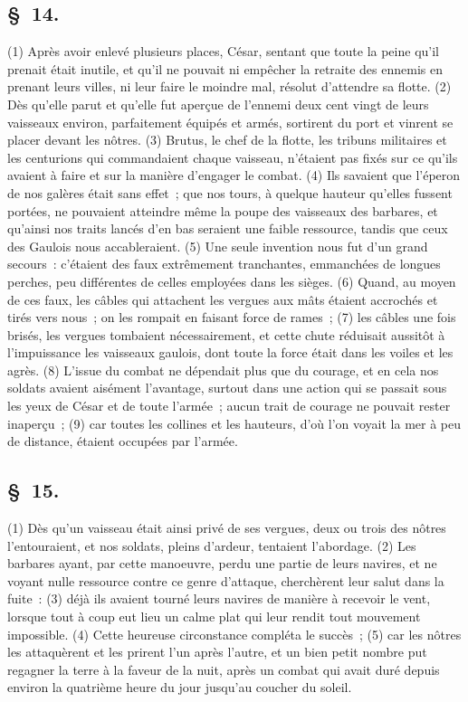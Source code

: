 \documentclass[french,twoside]{book} %
\begin{document}
\subsection[{§ 14.}]{ \textsc{§ 14.} }
\noindent (1) Après avoir enlevé plusieurs places, César, sentant que toute la peine qu’il prenait était inutile, et qu’il ne pouvait ni empêcher la retraite des ennemis en prenant leurs villes, ni leur faire le moindre mal, résolut d’attendre sa flotte. (2) Dès qu’elle parut et qu’elle fut aperçue de l’ennemi deux cent vingt de leurs vaisseaux environ, parfaitement équipés et armés, sortirent du port et vinrent se placer devant les nôtres. (3) Brutus, le chef de la flotte, les tribuns militaires et les centurions qui commandaient chaque vaisseau, n’étaient pas fixés sur ce qu’ils avaient à faire et sur la manière d’engager le combat. (4) Ils savaient que l’éperon de nos galères était sans effet ; que nos tours, à quelque hauteur qu’elles fussent portées, ne pouvaient atteindre même la poupe des vaisseaux des barbares, et qu’ainsi nos traits lancés d’en bas seraient une faible ressource, tandis que ceux des Gaulois nous accableraient. (5) Une seule invention nous fut d’un grand secours : c’étaient des faux extrêmement tranchantes, emmanchées de longues perches, peu différentes de celles employées dans les sièges. (6) Quand, au moyen de ces faux, les câbles qui attachent les vergues aux mâts étaient accrochés et tirés vers nous ; on les rompait en faisant force de rames ; (7) les câbles une fois brisés, les vergues tombaient nécessairement, et cette chute réduisait aussitôt à l’impuissance les vaisseaux gaulois, dont toute la force était dans les voiles et les agrès. (8) L'issue du combat ne dépendait plus que du courage, et en cela nos soldats avaient aisément l’avantage, surtout dans une action qui se passait sous les yeux de César et de toute l’armée ; aucun trait de courage ne pouvait rester inaperçu ; (9) car toutes les collines et les hauteurs, d’où l’on voyait la mer à peu de distance, étaient occupées par l’armée.
\subsection[{§ 15.}]{ \textsc{§ 15.} }
\noindent (1) Dès qu’un vaisseau était ainsi privé de ses vergues, deux ou trois des nôtres l’entouraient, et nos soldats, pleins d’ardeur, tentaient l’abordage. (2) Les barbares ayant, par cette manoeuvre, perdu une partie de leurs navires, et ne voyant nulle ressource contre ce genre d’attaque, cherchèrent leur salut dans la fuite : (3) déjà ils avaient tourné leurs navires de manière à recevoir le vent, lorsque tout à coup eut lieu un calme plat qui leur rendit tout mouvement impossible. (4) Cette heureuse circonstance compléta le succès ; (5) car les nôtres les attaquèrent et les prirent l’un après l’autre, et un bien petit nombre put regagner la terre à la faveur de la nuit, après un combat qui avait duré depuis environ la quatrième heure du jour jusqu’au coucher du soleil.
\end{document}
